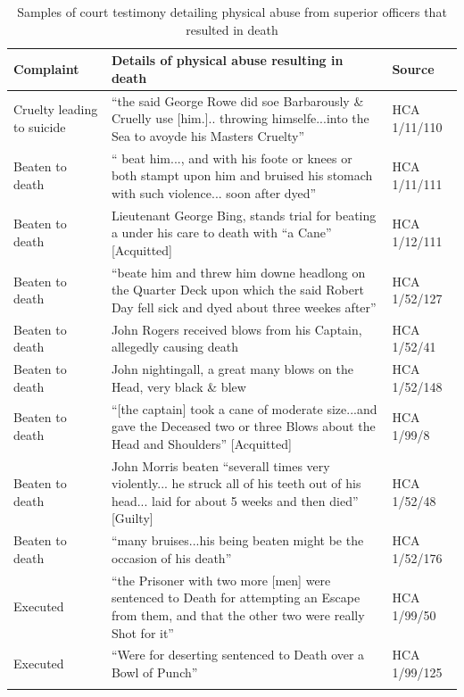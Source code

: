 \begin{table}
\caption{\label{tab:key:4.2} Samples of court testimony detailing physical abuse from superior officers that resulted in death}
 
\begin{tabularx}{\textwidth}{p{3cm}Ql}
\lsptoprule

\textbf{Complaint} & \textbf{Details} \textbf{of} \textbf{physical} \textbf{abuse} \textbf{resulting} \textbf{in} \textbf{death} & \textbf{Source}\\
\midrule
Cruelty leading to suicide & “the said George Rowe did soe Barbarously \& Cruelly use [him.].. throwing himselfe...into the Sea to avoyde his Masters Cruelty” & HCA 1/11/110\\
Beaten to death & “ beat him..., and with his foote or knees or both stampt upon him and bruised his stomach with such violence... soon after dyed” & HCA 1/11/111\\
Beaten to death & Lieutenant George Bing, stands trial for beating a  under his care to death with “a Cane” [Acquitted] & HCA 1/12/111\\
Beaten to death & “beate him and threw him downe headlong on the Quarter Deck upon which the said Robert Day fell sick and dyed about three weekes after” & HCA 1/52/127\\
Beaten to death & John Rogers received blows from his Captain, allegedly causing death & HCA 1/52/41\\
Beaten to death & John nightingall, a great many blows on the Head, very black \& blew & HCA 1/52/148\\
Beaten to death & “[the captain] took a cane of  moderate size...and gave the Deceased two or three Blows about the Head and Shoulders” [Acquitted] & HCA 1/99/8\\
Beaten to death & John Morris beaten “severall times very violently... he struck all of his teeth out of his head... laid for about 5 weeks and then died” [Guilty] & HCA 1/52/48\\
Beaten to death & “many bruises...his being beaten might be the occasion of his death” & HCA 1/52/176\\
Executed & “the Prisoner with two more [men] were sentenced to Death for attempting an Escape from them, and that the other two were really Shot for it” & HCA 1/99/50\\
Executed & “Were for deserting sentenced to Death over a Bowl of Punch” & HCA 1/99/125\\
\lspbottomrule
\end{tabularx}
\end{table}

